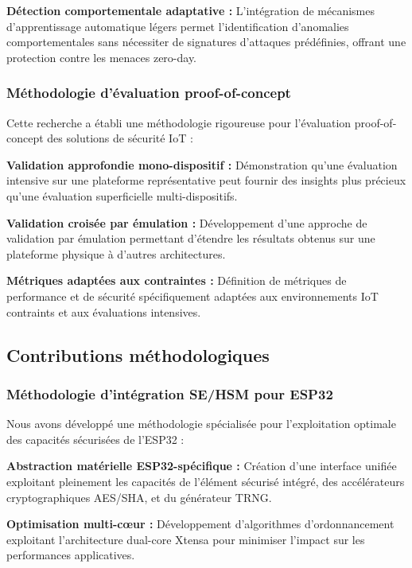\textbf{Détection comportementale adaptative :} L'intégration de mécanismes d'apprentissage automatique légers permet l'identification d'anomalies comportementales sans nécessiter de signatures d'attaques prédéfinies, offrant une protection contre les menaces zero-day.

\subsubsection{Méthodologie d'évaluation proof-of-concept}

Cette recherche a établi une méthodologie rigoureuse pour l'évaluation proof-of-concept des solutions de sécurité IoT :

\textbf{Validation approfondie mono-dispositif :} Démonstration qu'une évaluation intensive sur une plateforme représentative peut fournir des insights plus précieux qu'une évaluation superficielle multi-dispositifs.

\textbf{Validation croisée par émulation :} Développement d'une approche de validation par émulation permettant d'étendre les résultats obtenus sur une plateforme physique à d'autres architectures.

\textbf{Métriques adaptées aux contraintes :} Définition de métriques de performance et de sécurité spécifiquement adaptées aux environnements IoT contraints et aux évaluations intensives.

\subsection{Contributions méthodologiques}

\subsubsection{Méthodologie d'intégration SE/HSM pour ESP32}

Nous avons développé une méthodologie spécialisée pour l'exploitation optimale des capacités sécurisées de l'ESP32 :

\textbf{Abstraction matérielle ESP32-spécifique :} Création d'une interface unifiée exploitant pleinement les capacités de l'élément sécurisé intégré, des accélérateurs cryptographiques AES/SHA, et du générateur TRNG.

\textbf{Optimisation multi-cœur :} Développement d'algorithmes d'ordonnancement exploitant l'architecture dual-core Xtensa pour minimiser l'impact sur les performances applicatives.

